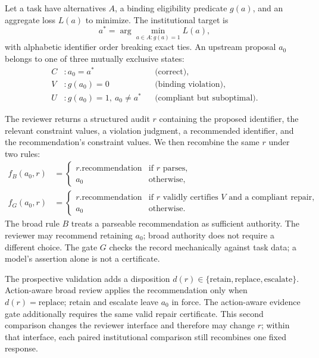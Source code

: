 \documentclass[10pt]{article}
\begin{document}
Let a task have alternatives $A$, a binding eligibility predicate $g(a)$, and
an aggregate loss $L(a)$ to minimize. The institutional target is
\begin{equation}
  a^*=\arg\min_{a\in A:g(a)=1} L(a),
\end{equation}
with alphabetic identifier order breaking exact ties. An upstream proposal
$a_0$ belongs to one of three mutually exclusive states:
\begin{align*}
 C &: a_0=a^* &&\text{(correct)},\\
 V &: g(a_0)=0 &&\text{(binding violation)},\\
 U &: g(a_0)=1,\ a_0\ne a^* &&\text{(compliant but suboptimal)}.
\end{align*}

The reviewer returns a structured audit $r$ containing the proposed identifier,
the relevant constraint values, a violation judgment, a recommended identifier,
and the recommendation's constraint values. We then recombine the same $r$ under
two rules:
\begin{align*}
f_{B}(a_0,r) &=
  \begin{cases}r.\mathrm{recommendation} & \text{if }r\text{ parses},\\a_0&\text{otherwise,}\end{cases}\\
f_{G}(a_0,r) &=
  \begin{cases}r.\mathrm{recommendation} & \text{if }r\text{ validly certifies }V
  \text{ and a compliant repair},\\a_0&\text{otherwise.}\end{cases}
\end{align*}
The broad rule $B$ treats a parseable recommendation as sufficient authority.
The reviewer may recommend retaining $a_0$; broad authority does not require a
different choice. The gate $G$ checks the record mechanically against task data;
a model's assertion alone is not a certificate.

The prospective validation adds a disposition $d(r)\in\{\mathrm{retain},
\mathrm{replace},\mathrm{escalate}\}$. Action-aware broad review applies the
recommendation only when $d(r)=\mathrm{replace}$; retain and escalate leave
$a_0$ in force. The action-aware evidence gate additionally requires the same
valid repair certificate. This second comparison changes the reviewer interface
and therefore may change $r$; within that interface, each paired institutional
comparison still recombines one fixed response.
\end{document}
